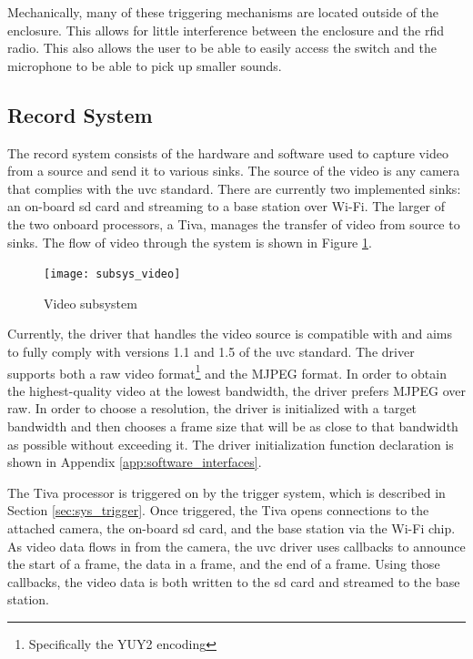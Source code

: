 \documentclass[12pt]{article}
\begin{document}
Mechanically, many of these triggering mechanisms are located outside of the
enclosure. This allows for little interference between the enclosure and the
\gls{rfid} radio. This also allows the user to be able to easily access the
switch and the microphone to be able to pick up smaller sounds.

\subsection{Record System}
\label{sec:sys_video}
The record system consists of the hardware and software used to capture video
from a source and send it to various sinks. The source of the video is any
camera that complies with the \gls{uvc} standard. There are currently two
implemented sinks: an on-board \gls{sd} card and streaming to a base station
over Wi-Fi. The larger of the two onboard processors, a Tiva, manages the
transfer of video from source to sinks. The flow of video through the system is
shown in Figure \ref{fig:video_flow}.

\begin{figure}[h]
    \centering
    \texttt{[image: subsys\_video]}
    \caption{Video subsystem}
    \label{fig:video_flow}
\end{figure}

Currently, the driver that handles the video source is compatible with and aims
to fully comply with versions 1.1 and 1.5 of the \gls{uvc}
standard\cite{uvc_standard_11,uvc_standard_15}. The driver supports both a raw
video format\footnote{Specifically the YUY2 encoding} and the MJPEG format. In
order to obtain the highest-quality video at the lowest bandwidth, the driver
prefers MJPEG over raw. In order to choose a resolution, the driver is
initialized with a target bandwidth and then chooses a frame size that will be
as close to that bandwidth as possible without exceeding it. The driver
initialization function declaration is shown in Appendix
\ref{app:software_interfaces}.

The Tiva processor is triggered on by the trigger system, which is described in
Section \ref{sec:sys_trigger}. Once triggered, the Tiva opens connections to
the attached camera, the on-board \gls{sd} card, and the base station via the
Wi-Fi chip. As video data flows in from the camera, the \gls{uvc} driver uses
callbacks to announce the start of a frame, the data in a frame, and the
end of a frame. Using those callbacks, the video data is both written to the
\gls{sd} card and streamed to the base station.
\end{document}
